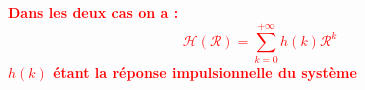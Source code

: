 \documentclass[a4paper,11pt]{beamer}
\begin{document}
\begin{frame}
\centering
\textbf{
\textcolor{red}{
Dans les deux cas on a : 
$$
\mathcal{H}(\mathcal{R}) = \sum_{k=0}^{+\infty}h(k)\mathcal{R}^k
$$
$h(k)$ étant la réponse impulsionnelle du système}}
\end{frame}
 
% 
% 
% 
% 
% 
% 
% 
\end{document}
